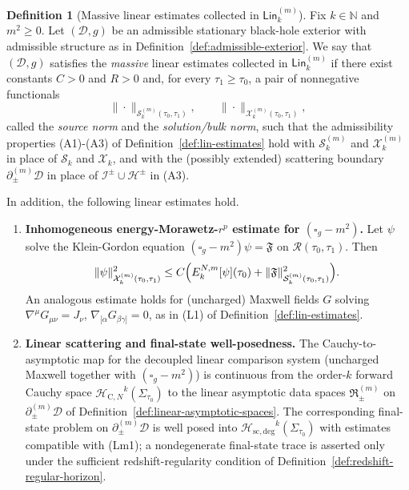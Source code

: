 \documentclass[11pt]{article}
\numberwithin{equation}{section}
\theoremstyle{plain}
\theoremstyle{definition}
\newtheorem{definition}{Definition}[section]
\theoremstyle{remark}
\newcommand{\Lin}{\mathsf{Lin}}
\newcommand{\Hcauchy}{\mathcal H_{\mathrm{C},N}}
\newcommand{\Hscatt}{\mathcal H_{\mathrm{sc,deg}}}
\begin{document}
\begin{definition}[Massive linear estimates collected in $\Lin_{k}^{(m)}$]\label{def:lin-estimates-massive}
Fix $k\in\mathbb N$ and $m^{2}\ge 0$.
Let $(\mathcal D,g)$ be an admissible stationary black-hole exterior with admissible structure as in Definition~\ref{def:admissible-exterior}.
We say that $(\mathcal D,g)$ satisfies the \emph{massive} linear estimates collected in $\Lin_{k}^{(m)}$ if there exist constants $C>0$ and $R>0$ and, for every $\tau_{1}\ge\tau_{0}$, a pair of nonnegative functionals
\begin{equation}
\|\cdot\|_{\mathcal S_{k}^{(m)}(\tau_{0},\tau_{1})},\qquad
\|\cdot\|_{\mathcal X_{k}^{(m)}(\tau_{0},\tau_{1})},
\end{equation}
called the \emph{source norm} and the \emph{solution/bulk norm}, such that the admissibility properties \textup{(A1)-(A3)} of Definition~\ref{def:lin-estimates} hold with $\mathcal S_{k}^{(m)}$ and $\mathcal X_{k}^{(m)}$ in place of $\mathcal S_{k}$ and $\mathcal X_{k}$, and with the (possibly extended) scattering boundary $\partial_{\pm}^{(m)}\mathcal D$ in place of $\mathcal I^{\pm}\cup\mathcal H^{\pm}$ in \textup{(A3)}.

In addition, the following linear estimates hold.
\begin{enumerate}
\item[(Lm1)] \textbf{Inhomogeneous energy-Morawetz-$r^{p}$ estimate for $(\square_{g}-m^{2})$.}
Let $\psi$ solve the Klein-Gordon equation $(\square_{g}-m^{2})\psi=\mathfrak{F}$ on $\mathcal{R}(\tau_{0},\tau_{1})$.
Then
\begin{equation}\label{eq:Lin-abstract-massive}
\|\psi\|_{\mathcal X_{k}^{(m)}(\tau_{0},\tau_{1})}^{2}
\le
C\Bigl(E^{N,m}_{k}[\psi](\tau_{0})
+\|\mathfrak{F}\|_{\mathcal S_{k}^{(m)}(\tau_{0},\tau_{1})}^{2}\Bigr).
\end{equation}
An analogous estimate holds for (uncharged) Maxwell fields $G$ solving
$\nabla^{\mu}G_{\mu\nu}=J_{\nu}$, $\nabla_{[\alpha}G_{\beta\gamma]}=0$,
as in \textup{(L1)} of Definition~\ref{def:lin-estimates}.

\item[(Lm2)] \textbf{Linear scattering and final-state well-posedness.}
The Cauchy-to-asymptotic map for the decoupled linear comparison system (uncharged Maxwell together with $(\square_{g}-m^{2})$) is continuous from the order-$k$ forward Cauchy space ${\Hcauchy}^{k}(\Sigma_{\tau_0})$ to the linear asymptotic data spaces $\mathfrak R_{\pm}^{(m)}$ on $\partial_{\pm}^{(m)}\mathcal D$ of Definition~\ref{def:linear-asymptotic-spaces}. The corresponding final-state problem on $\partial_{\pm}^{(m)}\mathcal D$ is well posed into ${\Hscatt}^{k}(\Sigma_{\tau_0})$ with estimates compatible with \textup{(Lm1)}; a nondegenerate final-state trace is asserted only under the sufficient redshift-regularity condition of Definition~\ref{def:redshift-regular-horizon}.
\end{enumerate}


\end{definition}
\end{document}
